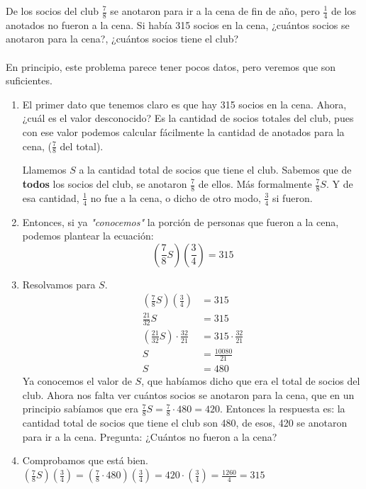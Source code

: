 \documentclass{article}
\begin{document}
\begin{ejemplo}
De los socios del club $\frac{7}{8}$ se anotaron para ir a la cena de fin de año, pero $\frac{1}{4}$ de los anotados no fueron a la cena. Si había 315 socios en la cena, ¿cuántos socios se anotaron para la cena?, ¿cuántos socios tiene el club?
\\ \\
En principio, este problema parece tener pocos datos, pero veremos que son suficientes.
\begin{enumerate}
	\item El primer dato que tenemos claro es que hay 315 socios en la cena. Ahora, ¿cuál es el valor desconocido? Es la cantidad de socios totales del club, pues con ese valor podemos calcular fácilmente la cantidad de anotados para la cena, ($\frac{7}{8}$ del total).
	
Llamemos $S$ a la cantidad total de socios que tiene el club. Sabemos que de \textbf{todos} los socios del club, se anotaron $\frac{7}{8}$ de ellos. Más formalmente $\frac{7}{8}S$. Y de esa cantidad, $\frac{1}{4}$ no fue a la cena, o dicho de otro modo, $\frac{3}{4}$ si fueron.

	\item Entonces, si ya \textit{"conocemos"} la porción de personas que fueron a la cena, podemos plantear la ecuación:
	\[(\frac{7}{8}S)(\frac{3}{4})=315\]
	\item Resolvamos para $S$.
	\begin{align}
	(\frac{7}{8}S)(\frac{3}{4})&=315\nonumber\\
	\frac{21}{32}S&=315\nonumber\\
	(\frac{21}{32}S)\cdot\frac{32}{21}&=315\cdot\frac{32}{21}\nonumber\\
	S&=\frac{10080}{21}\nonumber\\
	S&=480\nonumber
	\end{align}
	Ya conocemos el valor de $S$, que habíamos dicho que era el total de socios del club. Ahora nos falta ver cuántos socios se anotaron para la cena, que en un principio sabíamos que era $\frac{7}{8}S=\frac{7}{8}\cdot480=420$. Entonces la respuesta es: la cantidad total de socios que tiene el club son 480, de esos, 420 se anotaron para ir a la cena. Pregunta: ¿Cuántos no fueron a la cena?
	\item Comprobamos que está bien. $(\frac{7}{8}S)(\frac{3}{4})=(\frac{7}{8}\cdot480)(\frac{3}{4})=420\cdot(\frac{3}{4})=\frac{1260}{4}=315$
\end{enumerate}

\end{ejemplo}
\end{document}
